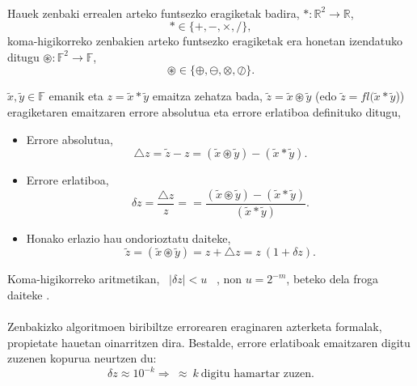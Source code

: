 \paragraph*{} Hauek zenbaki errealen arteko funtsezko eragiketak badira,  $\ast: \mathbb{R}^2\rightarrow \mathbb{R}$, 
\begin{equation*}
\ast\in \{+,-,\times,/ \},
\end{equation*}
koma-higikorreko zenbakien arteko funtsezko eragiketak era honetan izendatuko ditugu  $\circledast: \mathbb{F}^2\rightarrow \mathbb{F}$,
\begin{equation*}
\circledast\in \{\oplus,\ominus,\otimes,\oslash \}.
\end{equation*}

$\tilde x,\tilde y \in \mathbb{F}$ emanik eta $z= \tilde x \ast \tilde y$ emaitza zehatza bada, $\tilde z= \tilde x \circledast \tilde y$ (edo $\tilde z= fl(\tilde x \ast \tilde y$)) eragiketaren emaitzaren errore absolutua eta errore erlatiboa definituko ditugu,

\begin{itemize}
\item Errore absolutua,
\begin{equation*}
\triangle z=\tilde z-z =(\tilde x \circledast \tilde y) -(\tilde x \ast \tilde y).
\end{equation*} 
\item Errore erlatiboa,
\begin{equation*}
\delta z=\frac{\triangle z}{z}==\frac{(\tilde x \circledast \tilde y) -(\tilde x \ast \tilde y)}{(\tilde x \ast \tilde y)}.
\end{equation*} 
\item Honako erlazio hau ondorioztatu daiteke,
\begin{equation*}
\tilde z=(\tilde x \circledast \tilde y)=z+\triangle z=z \ (1+\delta z).  
\end{equation*}
\end{itemize}

Koma-higikorreko aritmetikan, \ $|\delta z|<u$ \ , non  $u=2^{-m}$, beteko dela froga daiteke \cite{Corless2013}.

\paragraph*{} Zenbakizko algoritmoen biribiltze errorearen eraginaren azterketa formalak, propietate hauetan oinarritzen dira. Bestalde, errore erlatiboak emaitzaren digitu zuzenen kopurua neurtzen du:
\begin{equation*}
\delta z \approx 10^{-k} \Rightarrow \ \approx \ k \ \mbox{digitu hamartar zuzen}.
\end{equation*}  


